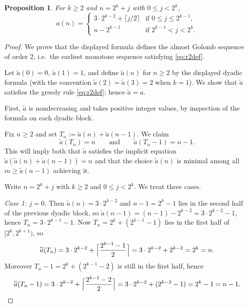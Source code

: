 \documentclass[12pt]{article}
\newtheorem{proposition}[theorem]{Proposition}
\theoremstyle{definition}
\theoremstyle{remark}
\begin{document}
\begin{proposition}\label{prop:dyadic}
  For $k\ge 2$ and $n = 2^k+j$ with $0\le j < 2^k$,
  \[
    a(n) = \begin{cases}
      3\cdot 2^{k-2} + \lceil j/2\rceil & \text{if } 0\le j\le 2^{k-1},\\
      n - 2^{k-1}                       & \text{if } 2^{k-1} < j < 2^k.
    \end{cases}
  \]
\end{proposition}

\begin{proof}
  We prove that the displayed formula defines the almost Golomb sequence of order $2$,
  i.e.\ the earliest monotone sequence satisfying \eqref{eq:r2def}.

  Let $\widetilde a(0)=0$, $\widetilde a(1)=1$, and define $\widetilde a(n)$ for
  $n\ge 2$ by the displayed dyadic formula (with the convention
  $\widetilde a(2)=\widetilde a(3)=2$ when $k=1$).
  We show that $\widetilde a$ satisfies the greedy rule \eqref{eq:r2def}; hence
  $\widetilde a=a$.

  First, $\widetilde a$ is nondecreasing and takes positive integer values,
  by inspection of the formula on each dyadic block.

  Fix $n\ge 2$ and set $T_n := \widetilde a(n)+\widetilde a(n-1)$.
  We claim
  \begin{equation}\label{eq:r2_anchor}
    \widetilde a(T_n)=n
    \qquad\text{and}\qquad
    \widetilde a(T_n-1)=n-1.
  \end{equation}
  This will imply both that $\widetilde a$ satisfies the implicit equation
  $\widetilde a(\widetilde a(n)+\widetilde a(n-1))=n$ and that the choice
  $\widetilde a(n)$ is minimal among all $m\ge \widetilde a(n-1)$ achieving it.

  Write $n=2^k+j$ with $k\ge 2$ and $0\le j<2^k$.
  We treat three cases.

  \textit{Case 1: $j=0$.} Then $\widetilde a(n)=3\cdot 2^{k-2}$ and
  $n-1=2^k-1$ lies in the second half of the previous dyadic block, so
  $\widetilde a(n-1)=(n-1)-2^{k-2}=3\cdot 2^{k-2}-1$,
  hence $T_n=3\cdot 2^{k-1}-1$.
  Now $T_n=2^k+(2^{k-1}-1)$ lies in the first half of $[2^k,2^{k+1})$, so
  \[
    \widetilde a(T_n)=3\cdot 2^{k-2}+\Bigl\lceil\frac{2^{k-1}-1}{2}\Bigr\rceil
    =3\cdot 2^{k-2}+2^{k-2}=2^k=n.
  \]
  Moreover $T_n-1=2^k+(2^{k-1}-2)$ is still in the first half, hence
  \[
    \widetilde a(T_n-1)=3\cdot 2^{k-2}+\Bigl\lceil\frac{2^{k-1}-2}{2}\Bigr\rceil
    =3\cdot 2^{k-2}+(2^{k-2}-1)=2^k-1=n-1.
  \]


\end{proof}
\end{document}
